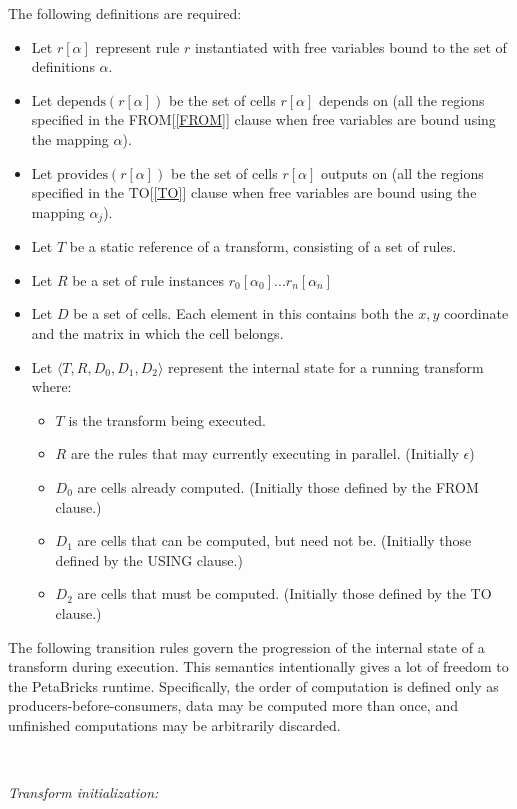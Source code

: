 \documentclass[11pt]{article}
\begin{document}
The following definitions are required:
\begin{itemize}
\item
Let $r[\alpha]$ represent rule $r$ instantiated with free variables
bound to the set of definitions $\alpha$.
\item
Let $\mbox{depends}(r[\alpha])$ be the set of cells $r[\alpha]$
depends on (all the regions specified in the FROM[\ref{FROM}] clause when
free variables are bound using the mapping $\alpha$).
\item
Let $\mbox{provides}(r[\alpha])$ be the set of cells $r[\alpha]$
outputs on (all the regions specified in the TO[\ref{TO}] clause when free
variables are bound using the mapping $\alpha_j$).
\item Let $T$ be a static reference of a transform, consisting of a set of rules.
\item Let $R$ be a set of rule instances $r_0[\alpha_0] ... r_n[\alpha_n]$
\item Let $D$ be a set of cells.  Each element in this contains both the $x,y$ coordinate and the matrix in which the cell belongs.
\item Let $\langle T, R, D_0, D_1, D_2 \rangle$ represent the internal state for a running transform where:
  \begin{itemize}
  \item $T$ is the transform being executed.
  \item $R$ are the rules that may currently executing in parallel.  (Initially $\epsilon$)
  \item $D_0$ are cells already computed.  (Initially those defined by the FROM clause.)
  \item $D_1$ are cells that can be computed, but need not be. (Initially those defined by the USING clause.) 
  \item $D_2$ are cells that must be computed.  (Initially those defined by the TO clause.)
  \end{itemize}
\end{itemize}

The following transition rules govern the progression of the internal state
of a transform during execution.  This semantics intentionally gives a lot of
freedom to the PetaBricks runtime.  Specifically,  the order of computation
is defined only as producers-before-consumers, data may be computed more
than once, and unfinished computations may be arbitrarily discarded.

~

\noindent
{\it
Transform initialization:}
\end{document}
